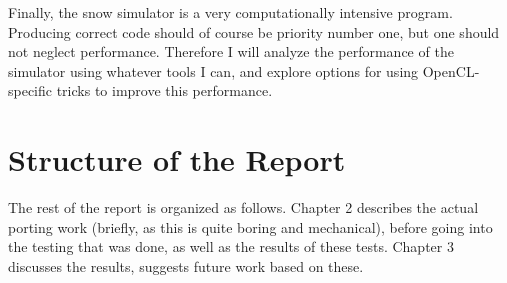 Finally, the snow simulator is a very computationally intensive program. Producing correct code should of course be priority number one, but one should not neglect performance. Therefore I will analyze the performance of the simulator using whatever tools I can, and explore options for using OpenCL-specific tricks to improve this performance.

\section{Structure of the Report}
The rest of the report is organized as follows. Chapter 2 describes the actual porting work (briefly, as this is quite boring and mechanical), before going into the testing that was done, as well as the results of these tests. Chapter 3 discusses the results, suggests future work based on these.